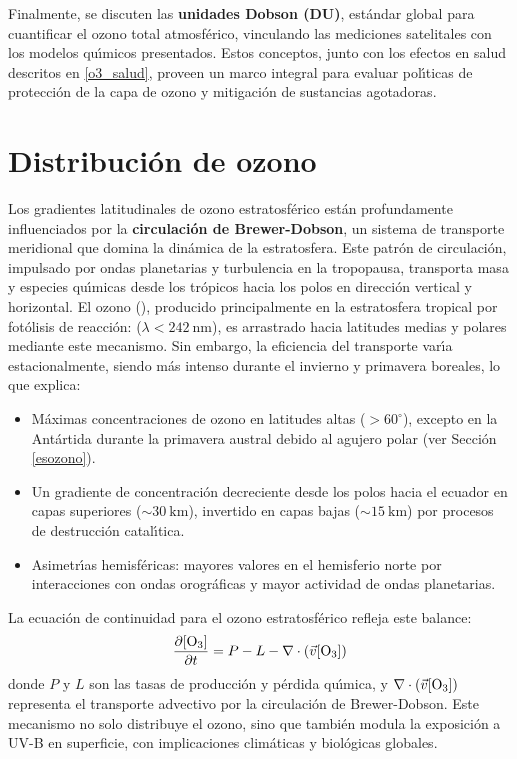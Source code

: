 Finalmente, se discuten las \textbf{unidades Dobson (\gls{DU})}, est\'andar global para cuantificar el ozono total atmosf\'erico, vinculando las mediciones satelitales con los modelos qu\'{\i}micos presentados. Estos conceptos, junto con los efectos en salud descritos en \ref{o3_salud}, proveen un marco integral para evaluar pol\'{\i}ticas de protecci\'on de la capa de ozono y mitigaci\'on de sustancias agotadoras.

\section{Distribuci\'on de ozono}
\label{dvozono}
Los gradientes latitudinales de ozono estratosf\'erico est\'an profundamente influenciados por la \textbf{circulaci\'on de Brewer-Dobson}, un sistema de transporte meridional que domina la din\'amica de la estratosfera. Este patr\'on de circulaci\'on, impulsado por ondas planetarias y turbulencia en la tropopausa, transporta masa y especies qu\'{\i}micas desde los tr\'opicos hacia los polos en direcci\'on vertical y horizontal. El ozono (), producido principalmente en la estratosfera tropical por fot\'olisis de  reacci\'on:  ($\lambda < \SI{242}{\nano\metre}$), es arrastrado hacia latitudes medias y polares mediante este mecanismo. Sin embargo, la eficiencia del transporte var\'{\i}a estacionalmente, siendo m\'as intenso durante el invierno y primavera boreales, lo que explica:

\begin{itemize}
    \item M\'aximas concentraciones de ozono en latitudes altas ($>60^\circ$), excepto en la Ant\'artida durante la primavera austral debido al agujero polar (ver Secci\'on \ref{esozono}).
    \item Un gradiente de concentraci\'on decreciente desde los polos hacia el ecuador en capas superiores ($\sim\SI{30}{\kilo\metre}$), invertido en capas bajas ($\sim\SI{15}{\kilo\metre}$) por procesos de destrucci\'on catal\'{\i}tica.
    \item Asimetr\'{\i}as hemisf\'ericas: mayores valores en el hemisferio norte por interacciones con ondas orogr\'aficas y mayor actividad de ondas planetarias.
\end{itemize}

La ecuaci\'on de continuidad para el ozono estratosf\'erico refleja este balance:
\begin{equation}
\frac{\partial [\ce{O3}]}{\partial t} = P - L - \nabla \cdot (\vec{v}[\ce{O3}])
\end{equation}
donde \( P \) y \( L \) son las tasas de producci\'on y p\'erdida qu\'{\i}mica, y \( \nabla \cdot (\vec{v}[\ce{O3}]) \) representa el transporte advectivo por la circulaci\'on de Brewer-Dobson. Este mecanismo no solo distribuye el ozono, sino que tambi\'en modula la exposici\'on a UV-B en superficie, con implicaciones clim\'aticas y biol\'ogicas globales.

